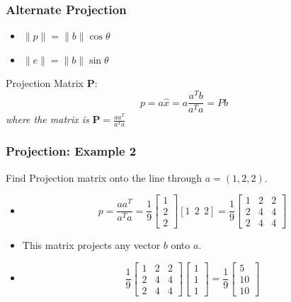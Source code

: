 \documentclass{beamer}
\newtheorem{Key points}{Key points}
\begin{document}
 \begin{frame}
   \frametitle{Alternate Projection}
   \begin{center}
     \begin{itemize}
     \item $\lVert{}p\rVert= \lVert{}b\rVert{}\cos\theta$
     \item $\lVert{}e\rVert=\lVert{}b\rVert{}\sin\theta$
     \end{itemize}
   \end{center}
 {
  \begin{definition}
    Projection Matrix $\mathbf{P}$:
    \begin{equation*}
      p = a\hat{x} = a\frac{a^Tb}{a^Ta}=Pb
    \end{equation*}
\emph{where the matrix is} $\mathbf{P}=\frac{aa^T}{a^Ta}$
  \end{definition}
}
 \end{frame}
 \begin{frame}
   \frametitle{Projection: Example 2}
   Find Projection matrix onto the line through $a=(1,2,2)$.
   \begin{itemize}
   \item<2-> \begin{equation*}
p=\frac{aa^T}{a^Ta}=\frac{1}{9}
     \begin{bmatrix}
       1\\2\\2
     \end{bmatrix}[1~~2~~2]=
    \frac{1}{9} \begin{bmatrix}
       1 & 2 & 2\\
       2 & 4 & 4\\
       2 & 4 & 4
     \end{bmatrix}
        \end{equation*}
\item<3-> This matrix projects any vector $b$ onto $a$.
\item<4->
  \begin{equation*}
        \frac{1}{9} \begin{bmatrix}
       1 & 2 & 2\\
       2 & 4 & 4\\
       2 & 4 & 4
     \end{bmatrix}
     \begin{bmatrix}
       1\\1\\1
     \end{bmatrix}
=\frac{1}{9}
\begin{bmatrix}
  5\\10\\10
\end{bmatrix}
  \end{equation*}
   \end{itemize}
 \end{frame}
\end{document}
